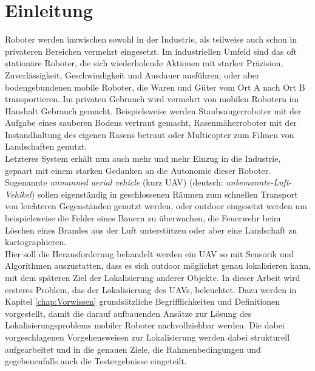 \clearpage
\chapter{\textbf{Einleitung}}\label{chap:Einleitung}

Roboter werden inzwischen sowohl in der Industrie, als teilweise auch schon in privateren Bereichen vermehrt eingesetzt. Im industriellen Umfeld sind das oft stationäre Roboter, die sich wiederholende Aktionen mit starker Präzision, Zuverlässigkeit, Geschwindigkeit und Ausdauer ausführen, oder aber bodengebundenen mobile Roboter, die Waren und Güter vom Ort A nach Ort B transportieren. Im privaten Gebrauch wird vermehrt von mobilen Robotern im Haushalt Gebrauch gemacht. Beispielsweise werden Staubsaugerroboter mit der Aufgabe eines sauberen Bodens vertraut gemacht, Rasenmäherroboter mit der Instandhaltung des eigenen Rasens betraut oder Multicopter zum Filmen von Landschaften genutzt.\\
Letzteres System erhält nun auch mehr und mehr Einzug in die Industrie, gepaart mit einem starken Gedanken an die Autonomie dieser Roboter. Sogenannte \textit{unmanned aerial vehicle} (kurz UAV) (deutsch: \textit{unbemannte-Luft-Vehikel}) sollen eigenständig in geschlossenen Räumen zum schnellen Transport von leichteren Gegenständen genutzt werden, oder outdoor eingesetzt werden um beispielsweise die Felder eines Bauern zu überwachen, die Feuerwehr beim Löschen eines Brandes aus der Luft unterstützen oder aber eine Landschaft zu kartographieren.\\
Hier soll die Herausforderung behandelt werden ein UAV so mit Sensorik und Algorithmen auszustatten, dass es sich outdoor möglichst genau lokalisieren kann, mit dem späteren Ziel der Lokalisierung anderer Objekte. In dieser Arbeit wird ersteres Problem, das der Lokalisierung des UAVs, beleuchtet. Dazu werden in Kapitel \ref{chap:Vorwissen} grundsätzliche Begrifflichkeiten und Definitionen vorgestellt, damit die darauf aufbauenden Ansätze zur Lösung des Lokalisierungsproblems mobiler Roboter nachvollziehbar werden. Die dabei vorgeschlagenen Vorgehensweisen zur Lokalisierung werden dabei strukturell aufgearbeitet und in die genauen Ziele, die Rahmenbedingungen und gegebenenfalls auch die Testergebnisse eingeteilt. 

